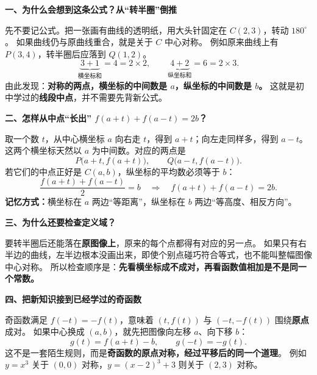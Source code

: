 \clearpage
\begin{explanationbox}
\textbf{\textcolor{CExplanation}{一、为什么会想到这条公式？从“转半圈”倒推}}



先不要记公式。把一张画有曲线的透明纸，用大头针固定在 $C(2,3)$，转动 $180^\circ$。
如果曲线仍与原曲线重合，就是关于 $C$ 中心对称。
例如原来曲线上有 $P(3,4)$，转半圈后应落到 $Q(1,2)$。
\[
\underbrace{3+1}_{\text{横坐标和}}=4=2\times2,\qquad
\underbrace{4+2}_{\text{纵坐标和}}=6=2\times3.
\]
由此发现：\textbf{对称的两点，横坐标的中间数是 $a$，纵坐标的中间数是 $b$。}
这就是初中学过的\textbf{线段中点}，并不需要先背新公式。



\medskip

\end{explanationbox}
\clearpage
\begin{explanationbox}
\textbf{\textcolor{CExplanation}{二、怎样从中点“长出” $f(a+t)+f(a-t)=2b$？}}



取一个数 $t$，从中心横坐标 $a$ 向右走 $t$，得到 $a+t$；向左走同样多，得到 $a-t$。
这两个横坐标天然以 $a$ 为中间数。对应的两点是
\[
P\bigl(a+t,f(a+t)\bigr),\qquad Q\bigl(a-t,f(a-t)\bigr).
\]
若它们的中点正好是 $C(a,b)$，纵坐标的平均数必须等于 $b$：
\[
\frac{f(a+t)+f(a-t)}{2}=b
\quad\Longrightarrow\quad
\boxed{f(a+t)+f(a-t)=2b}.
\]
\textbf{记忆方式：}横坐标在 $a$ 两边“等距离”，纵坐标在 $b$ 两边“等高度、相反方向”。

\medskip

\end{explanationbox}
\clearpage
\begin{explanationbox}
\textbf{\textcolor{CExplanation}{三、为什么还要检查定义域？}}



要转半圈后还能落在\textbf{原图像上}，原来的每个点都得有对应的另一点。
如果只有右半边的曲线，左半边根本没画出来，即使个别点碰巧符合等式，也不能叫整幅图像中心对称。
所以检查顺序是：\textbf{先看横坐标成不成对，再看函数值相加是不是同一个常数。}

\medskip

\end{explanationbox}
\clearpage
\begin{explanationbox}
\textbf{\textcolor{CExplanation}{四、把新知识接到已经学过的奇函数}}



奇函数满足 $f(-t)=-f(t)$，意味着 $(t,f(t))$ 与 $(-t,-f(t))$ 围绕\textbf{原点}成对。
如果中心换成 $(a,b)$，就先把图像向左移 $a$、向下移 $b$：
\[
 g(t)=f(a+t)-b,\qquad g(-t)=-g(t).
\]
这不是一套陌生规则，而是\textbf{奇函数的原点对称，经过平移后的同一个道理}。
例如 $y=x^3$ 关于 $(0,0)$ 对称，$y=(x-2)^3+3$ 则关于 $(2,3)$ 对称。


\medskip

\end{explanationbox}
